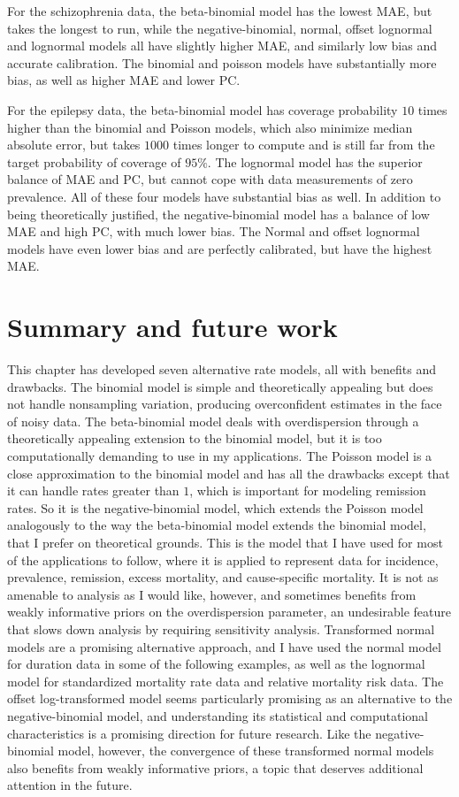   For the schizophrenia data, the beta-binomial model has the lowest
  MAE, but takes the longest to run, while the negative-binomial,
  normal, offset lognormal and lognormal models all have slightly
  higher MAE, and similarly low bias and accurate calibration.  The
  binomial and poisson models have substantially more bias, as well as
  higher MAE and lower PC.

  For the epilepsy data, the beta-binomial model has coverage
  probability $10$ times higher than the binomial and Poisson models,
  which also minimize median absolute error, but takes $1000$ times
  longer to compute and is still far from the target probability of
  coverage of $95\%$.  The lognormal model has the superior balance of
  MAE and PC, but cannot cope with data measurements of zero
  prevalence.  All of these four models have substantial bias as well.
  In addition to being theoretically justified, the negative-binomial
  model has a balance of low MAE and high PC, with much lower bias.
  The Normal and offset lognormal models have even lower bias and are
  perfectly calibrated, but have the highest MAE.

\section{Summary and future work}
This chapter has developed seven alternative rate models, all with
benefits and drawbacks.  The binomial model is simple and
theoretically appealing but does not handle nonsampling variation,
producing overconfident estimates in the face of noisy data.  The
beta-binomial model deals with overdispersion through a theoretically
appealing extension to the binomial model, but it is too
computationally demanding to use in my applications.  The Poisson
model is a close approximation to the binomial model and has all
the drawbacks except that it can handle rates greater than $1$, which is
important for modeling remission rates.  So it is the
negative-binomial model, which extends the Poisson model analogously
to the way the beta-binomial model extends the binomial model, that I
prefer on theoretical grounds.  This is the model that I have used for
most of the applications to follow, where it is applied to represent
data for incidence, prevalence, remission, excess mortality, and
cause-specific mortality. It is not as amenable to analysis as I would
like, however, and sometimes benefits from weakly informative priors on
the overdispersion parameter, an undesirable feature that slows down
analysis by requiring sensitivity analysis.  Transformed normal models
are a promising alternative approach, and I have used the normal model
for duration data in some of the following examples, as well as the
lognormal model for standardized mortality rate data and relative
mortality risk data. The offset log-transformed model seems
particularly promising as an alternative to the negative-binomial
model, and understanding its statistical and computational
characteristics is a promising direction for future research.  Like
the negative-binomial model, however, the convergence of these
transformed normal models also benefits from weakly informative priors,
a topic that deserves additional attention in the future.
